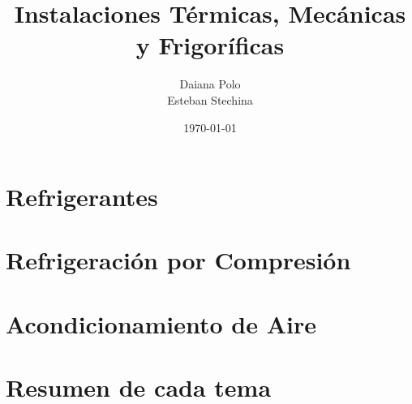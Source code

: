 \documentclass[spanish,11pt,a4paper, oneside]{book}
\title{Instalaciones Térmicas, Mecánicas y Frigoríficas}
\author{Daiana Polo\\Esteban Stechina}
\date{\today}
\begin{document}
		\setlength{\headheight}{14pt}
		\addtolength{\topmargin}{-2pt}

		\maketitle
		
		\pagestyle{fancy}
			\setcounter{tocdepth}{1}
		\begin{multicols}{2}
			\tableofcontents
		\end{multicols}
			\setcounter{minitocdepth}{4}
		
%		
		\part{Refrigerantes}
		
		
		\part{Refrigeración por Compresión}
		
		
		
		
		
		
		\part{Acondicionamiento de Aire}
		
		
		
		
		
		
		\part{Resumen de cada tema}
		
		
		
		
		

	\printbibliography
	\printglossaries
\end{document}
